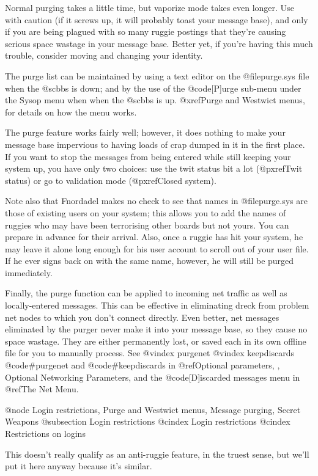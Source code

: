 Normal purging takes a little time,
but vaporize mode takes even longer.  Use with caution (if it screws up,
it will probably toast your message base), and only if you are being
plagued with so many ruggie postings that they're causing serious space
wastage in your message base.  Better yet, if you're having this much
trouble, consider moving and changing your identity.

The purge list can be maintained by using a text
editor on the @file{purge.sys} file when the @sc{bbs} is down; and by
the use of the @code{[P]urge} sub-menu under the Sysop menu when
when the @sc{bbs} is up.  @xref{Purge and Westwict menus}, for
details on how the menu works.

The purge feature works fairly well; however, it
does nothing to make your message base impervious to
having loads of crap dumped in it in the first place.  If you
want to stop the messages from being entered while still keeping
your system up, you have only
two choices:  use the twit status bit a lot (@pxref{Twit status}) or
go to validation mode (@pxref{Closed system}).

Note also that Fnordadel makes no check to see
that names in @file{purge.sys} are those of existing users on
your system; this allows you to add the names of ruggies
who may have been terrorising other boards but not yours.
You can prepare in advance for their arrival.  Also, once
a ruggie has hit your system, he may leave it alone long
enough for his user account to scroll out of your user file.
If he ever signs back on with the same name, however, he
will still be purged immediately.

Finally, the purge function can be applied to incoming net
traffic as well as locally-entered messages.  This can be effective
in eliminating dreck from problem net nodes to which you don't connect
directly.  Even better, net messages eliminated by the purger never
make it into your message base, so they cause no space wastage.  They are
either permanently lost, or saved each in its own offline file for you to
manually process.  See
@vindex purgenet
@vindex keepdiscards
@code{#purgenet} and @code{#keepdiscards} in
@ref{Optional parameters, , Optional Networking Parameters},
and the @code{[D]iscarded messages} menu in @ref{The Net Menu}.

@node Login restrictions, Purge and Westwict menus, Message purging, Secret Weapons
@subsection Login restrictions
@cindex Login restrictions
@cindex Restrictions on logins

This doesn't really qualify as an anti-ruggie
feature, in the truest sense, but we'll put it here
anyway because it's similar.

